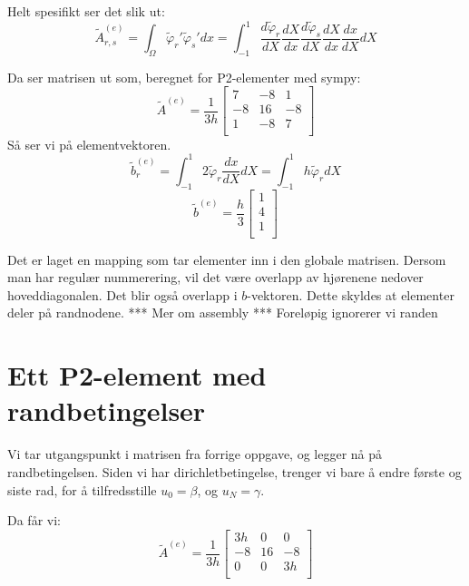 \documentclass[a4paper, 10pt]{article}
\begin{document}
Helt spesifikt ser det slik ut:
\begin{equation}
	\tilde A^{(e)}_{r, s} = \int_{\Omega} \tilde\varphi_r'\tilde\varphi_s' dx = \int_{-1}^1 \frac{d\tilde\varphi_r}{dX} \frac{d X}{d x}\frac{d\tilde\varphi_s}{dX} \frac{d X}{d x} \frac{d x}{dX} dX
\end{equation}

 Da ser matrisen ut som, beregnet for P2-elementer med sympy:
 \begin{equation}
 \tilde A^{(e)} = \frac{1}{3h}
 \left\lbrack
 \begin{array}{ccc}
7 & -8 & 1 \\  
-8 & 16 & -8 \\  
1 & -8 & 7 \\  
\end{array}
\right\rbrack
 \end{equation}
Så ser vi på elementvektoren. 
\begin{equation}
	\tilde b^{(e)}_r = \int_{-1}^1 2\tilde\varphi_r\frac{dx}{dX}dX = \int_{-1}^1 h\tilde\varphi_r dX
\end{equation}
\begin{equation}
	\tilde b^{(e)} = \frac{h}{3}\left\lbrack
	\begin{array}{c}
1 \\
4 \\
1 \\
\end{array}
\right\rbrack
\end{equation}

Det er laget en mapping som tar elementer inn i den globale matrisen. Dersom man har regulær nummerering, vil det være overlapp av hjørenene nedover hoveddiagonalen. Det blir også overlapp i $b$-vektoren. Dette skyldes at elementer deler på randnodene. 
*** Mer om assembly ***
Foreløpig ignorerer vi randen

\section{Ett P2-element med randbetingelser}

Vi tar utgangspunkt i matrisen fra forrige oppgave, og legger nå på randbetingelsen.
Siden vi har dirichletbetingelse, trenger vi bare å endre første og siste rad, for å tilfredsstille $u_0=\beta$, og $u_N = \gamma$.

Da får vi:
\begin{equation}
	 \tilde A^{(e)} = \frac{1}{3h}
 \left\lbrack
 \begin{array}{ccc}
3h & 0 & 0 \\  
-8 & 16 & -8 \\  
0 & 0 & 3h \\  
\end{array}
\right\rbrack
\end{equation}
\end{document}
